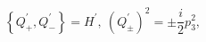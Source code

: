 \begin{equation}
\label{27}\ \left\{ Q_{+}^{\prime },Q_{-}^{\prime }\right\} =H^{\prime },\
\left( Q_{\pm }^{\prime }\right) ^2=\pm \frac i2p_3^2, 
\end{equation}


